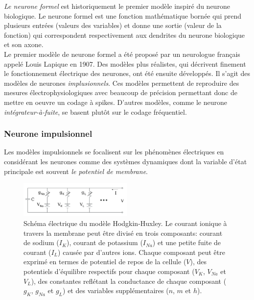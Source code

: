 \textit{Le neurone formel} est historiquement le premier modèle inspiré du neurone biologique. Le neurone formel est une fonction mathématique bornée qui prend plusieurs entrées (valeurs des variables) et donne une sortie (valeur de la fonction) qui correspondent respectivement aux dendrites du neurone biologique et son axone.\\

Le premier modèle de neurone formel a été proposé par un neurologue français appelé Louis Lapique en 1907. Des modèles plus réalistes, qui décrivent finement le fonctionnement électrique des neurones, ont été ensuite développés. Il s'agit des modèles de neurones \textit{implusionnels}. Ces modèles permettent de reproduire des mesures électrophysiologiques avec beaucoup de précision permettant donc de mettre en oeuvre un codage à spikes. D'autres modèles, comme le neurone \textit{intégrateur-à-fuite}, se basent plutôt sur le codage fréquentiel. 

\subsubsection{Neurone impulsionnel}

Les modèles impulsionnels se focalisent sur les phénomènes électriques en considérant les neurones comme des systèmes dynamiques dont la variable d'état principale est souvent \textit{le potentiel de membrane}.\\

\begin{figure}[htbp]
\begin{center}
\includegraphics[width=0.5\textwidth]{figures/ch1_5_Hodgkin-huxley-circuit.pdf}
\end{center}
\caption{Schéma électrique du modèle Hodgkin-Huxley. Le courant ionique à travers la membrane peut être divisé en trois composants: courant de sodium ($I_K$), courant de potassium ($I_{Na}$) et une petite fuite de courant ($I_L$) causée par d'autres ions. Chaque composant peut être exprimé en termes de potentiel de repos de la cellule ($V$), des potentiels d'équilibre respectifs pour chaque composant ($V_K$, $V_{Na}$ et $V_L$), des constantes reflétant la conductance de chaque composant ($g_K$, $g_{Na}$ et $g_{L}$) et des variables supplémentaires ($n$, $m$ et $h$).}
\label{Hodgkin}
\end{figure}

